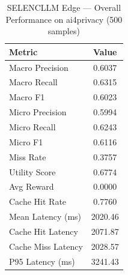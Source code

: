 
\begin{table}[h]
\centering
\caption{SELENCLLM Edge — Overall Performance on ai4privacy (500 samples)}
\label{tab:main_results}
\begin{tabular}{lc}
\hline
\textbf{Metric} & \textbf{Value} \\
\hline
Macro Precision      & 0.6037 \\
Macro Recall         & 0.6315 \\
Macro F1             & 0.6023 \\
Micro Precision      & 0.5994 \\
Micro Recall         & 0.6243 \\
Micro F1             & 0.6116 \\
Miss Rate            & 0.3757 \\
Utility Score        & 0.6774 \\
Avg Reward           & 0.0000 \\
Cache Hit Rate       & 0.7760 \\
\hline
Mean Latency (ms)    & 2020.46 \\
Cache Hit Latency    & 2071.87 \\
Cache Miss Latency   & 2028.57 \\
P95 Latency (ms)     & 3241.43 \\
\hline
\end{tabular}
\end{table}
